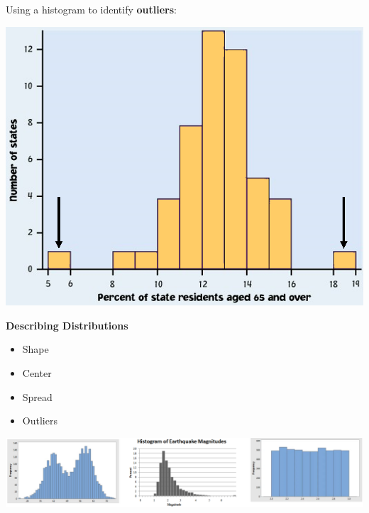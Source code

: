 \documentclass[11pt,letterpaper,twoside]{article}
\begin{document}
\newpage

Using a histogram to identify {\bf outliers}: \vspace{6pt}

\hspace{240pt}\includegraphics[scale=0.6]{images/hist4.png}

\vspace{20pt}

{\bf Describing Distributions}

\begin{itemize}

\item Shape \vspace{40pt}

\item Center \vspace{40pt}

\item Spread \vspace{40pt}

\item Outliers \vspace{20pt} 

\end{itemize}

\begin{center}
\includegraphics[scale=0.8]{images/hists2.png}
\end{center}
\end{document}
